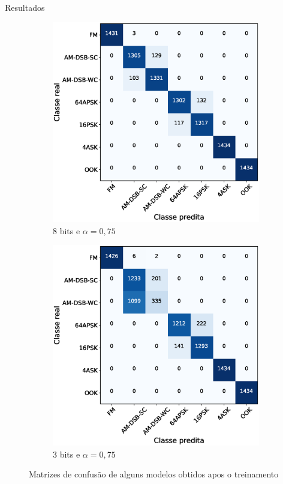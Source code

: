 \begin{frame}{Resultados}
    \begin{figure}[H]
  \centering

  \begin{subfigure}[b]{0.45\textwidth}
    \includegraphics[width=\textwidth]{figuras/cm_8_075.eps}
    \caption{$8$ bits e $\alpha=0,75$}
    \label{fig:subfig1}
  \end{subfigure}
  \hfill
  \begin{subfigure}[b]{0.45\textwidth}
    \includegraphics[width=\textwidth]{figuras/cm_3_075.eps}
    \caption{$3$ bits e $\alpha=0,75$}
    \label{fig:subfig2}
  \end{subfigure}
  \caption{Matrizes de confusão de alguns modelos obtidos apos o treinamento}
  \end{figure}

\end{frame}

